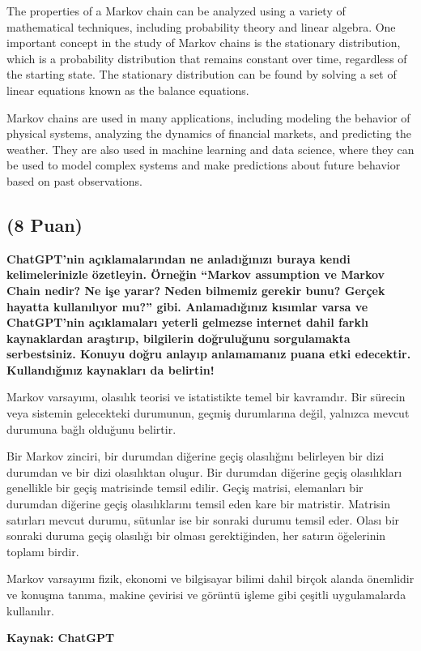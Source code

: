 \documentclass[11pt]{article}
\begin{document}
The properties of a Markov chain can be analyzed using a variety of mathematical techniques, including probability theory and linear algebra. One important concept in the study of Markov chains is the stationary distribution, which is a probability distribution that remains constant over time, regardless of the starting state. The stationary distribution can be found by solving a set of linear equations known as the balance equations.

Markov chains are used in many applications, including modeling the behavior of physical systems, analyzing the dynamics of financial markets, and predicting the weather. They are also used in machine learning and data science, where they can be used to model complex systems and make predictions about future behavior based on past observations.

\subsection{(8 Puan)} \textbf{ChatGPT’nin açıklamalarından ne anladığınızı buraya kendi kelimelerinizle özetleyin. Örneğin ``Markov assumption ve Markov Chain nedir? Ne işe yarar? Neden bilmemiz gerekir bunu? Gerçek hayatta kullanılıyor mu?'' gibi. Anlamadığınız kısımlar varsa ve ChatGPT’nin açıklamaları yeterli gelmezse internet dahil farklı kaynaklardan araştırıp, bilgilerin doğruluğunu sorgulamakta serbestsiniz. Konuyu doğru anlayıp anlamamanız puana etki edecektir. Kullandığınız kaynakları da belirtin!}

Markov varsayımı, olasılık teorisi ve istatistikte temel bir kavramdır. Bir sürecin veya sistemin gelecekteki durumunun, geçmiş durumlarına değil, yalnızca mevcut durumuna bağlı olduğunu belirtir. 

Bir Markov zinciri, bir durumdan diğerine geçiş olasılığını belirleyen bir dizi durumdan ve bir dizi olasılıktan oluşur. Bir durumdan diğerine geçiş olasılıkları genellikle bir geçiş matrisinde temsil edilir. Geçiş matrisi, elemanları bir durumdan diğerine geçiş olasılıklarını temsil eden kare bir matristir. Matrisin satırları mevcut durumu, sütunlar ise bir sonraki durumu temsil eder. Olası bir sonraki duruma geçiş olasılığı bir olması gerektiğinden, her satırın öğelerinin toplamı birdir.

Markov varsayımı fizik, ekonomi ve bilgisayar bilimi dahil birçok alanda önemlidir ve konuşma tanıma, makine çevirisi ve görüntü işleme gibi çeşitli uygulamalarda kullanılır.

\textbf{Kaynak: ChatGPT}
\end{document}
